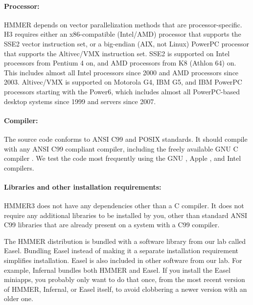 \paragraph{Processor:} HMMER depends on vector parallelization methods
that are processor-specific. H3 requires either an x86-compatible
(Intel/AMD) processor that supports the SSE2 vector instruction set,
or a big-endian (AIX, not Linux) PowerPC processor that supports the
Altivec/VMX instruction set. SSE2 is supported on Intel processors
from Pentium 4 on, and AMD processors from K8 (Athlon 64) on. This
includes almost all Intel processors since 2000 and AMD processors
since 2003. Altivec/VMX is supported on Motorola G4, IBM G5, and IBM
PowerPC processors starting with the Power6, which includes almost all
PowerPC-based desktop systems since 1999 and servers since
2007.

\paragraph{Compiler:} The source code conforms to ANSI
C99 and POSIX standards. It should compile with any ANSI C99 compliant
compiler, including the freely available GNU C compiler .
We test the code most frequently using the GNU , Apple
, and Intel  compilers.


\paragraph{Libraries and other installation requirements:}
HMMER3 does not have any dependencies other than a C compiler.  It
does not require any additional libraries to be installed by you,
other than standard ANSI C99 libraries that are already present on a
system with a C99 compiler.

The HMMER distribution is bundled with a software library from our lab
called Easel.
Bundling Easel instead of making it a separate installation
requirement simplifies installation. Easel is also included in other
software from our lab. For example,
Infernal
bundles both HMMER and Easel. If you install the Easel miniapps, you
probably only want to do that once, from the most recent version of
HMMER, Infernal, or Easel itself, to avoid clobbering a newer version
with an older one.

